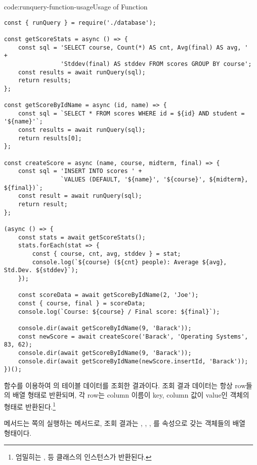 \begin{codeenv}{code:runquery-function-usage}{Usage of  Function}\begin{verbatim}
const { runQuery } = require('./database');

const getScoreStats = async () => {
    const sql = 'SELECT course, Count(*) AS cnt, Avg(final) AS avg, ' +
                'Stddev(final) AS stddev FROM scores GROUP BY course';
    const results = await runQuery(sql);
    return results;
};

const getScoreByIdName = async (id, name) => {
    const sql = `SELECT * FROM scores WHERE id = ${id} AND student = '${name}'`;
    const results = await runQuery(sql);
    return results[0];
};

const createScore = async (name, course, midterm, final) => {
    const sql = 'INSERT INTO scores ' +
                `VALUES (DEFAULT, '${name}', '${course}', ${midterm}, ${final})`;
    const result = await runQuery(sql);
    return result;
};

(async () => {
    const stats = await getScoreStats();
    stats.forEach(stat => {
        const { course, cnt, avg, stddev } = stat;
        console.log(`${course} (${cnt} people): Average ${avg}, Std.Dev. ${stddev}`);
    });

    const scoreData = await getScoreByIdName(2, 'Joe');
    const { course, final } = scoreData;
    console.log(`Course: ${course} / Final score: ${final}`);

    console.dir(await getScoreByIdName(9, 'Barack'));
    const newScore = await createScore('Barack', 'Operating Systems', 83, 62);
    console.dir(await getScoreByIdName(9, 'Barack'));
    console.dir(await getScoreByIdName(newScore.insertId, 'Barack'));
})();
\end{verbatim}
\end{codeenv}

\는  함수를 이용하여 의  테이블 데이터를 조회한 결과이다. 조회 결과 데이터는 항상 row들의 배열 형태로 반환되며, 각 row는 column 이름이 key, column 값이 value인 객체의 형태로 반환된다.\footnote{엄밀히는 ,  등 클래스의 인스턴스가 반환된다.}

 메서드는 \pageref{shell:group-by-example}쪽의 \을 실행하는 메서드로, 조회 결과는 , , , 를 속성으로 갖는 객체들의 배열 형태이다.

